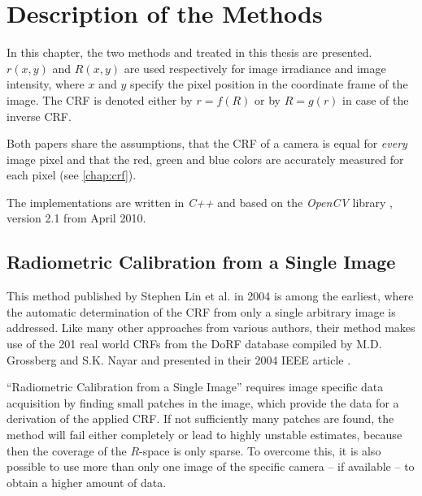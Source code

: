 \chapter{Description of the Methods}
\label{chap:description}
In this chapter, the two methods \cite{Lin04radiometriccalibration} and \cite{ng_cvpr07} treated in this thesis are presented. $r(x,y)$ and $R(x,y)$ are used respectively for image irradiance and image intensity, where $x$ and $y$ specify the pixel position in the coordinate frame of the image. The CRF is denoted either by $r = f(R)$ or by $R = g(r)$ in case of the inverse CRF.

Both papers share the assumptions, that the CRF of a camera is equal for \emph{every} image pixel and that the red, green and blue colors are accurately measured for each pixel (see \autoref{chap:crf}).

The implementations are written in \emph{C++} and based on the \emph{OpenCV} library \cite{opencv_library}, version 2.1 from April 2010.




\clearpage


\section{Radiometric Calibration from a Single Image}
\label{sec:radcal}
This method published by Stephen Lin et \hbox{al.} in 2004 \cite{Lin04radiometriccalibration} is among the earliest, where the automatic determination of the CRF from only a single arbitrary image is addressed. Like many other approaches from various authors, their method makes use of the 201 real world CRFs from the DoRF database compiled by M.D. Grossberg and S.K. Nayar and presented in their 2004 IEEE article \cite{CAVE_0091}.

``Radiometric Calibration from a Single Image'' requires image specific data acquisition by finding small patches in the image, which provide the data for a derivation of the applied CRF. If not sufficiently many patches are found, the method will fail either completely or lead to highly unstable estimates, because then the coverage of the $R$-space is only sparse. To overcome this, it is also possible to use more than only one image of the specific camera -- if available -- to obtain a higher amount of data.

\vspace{1cm}

